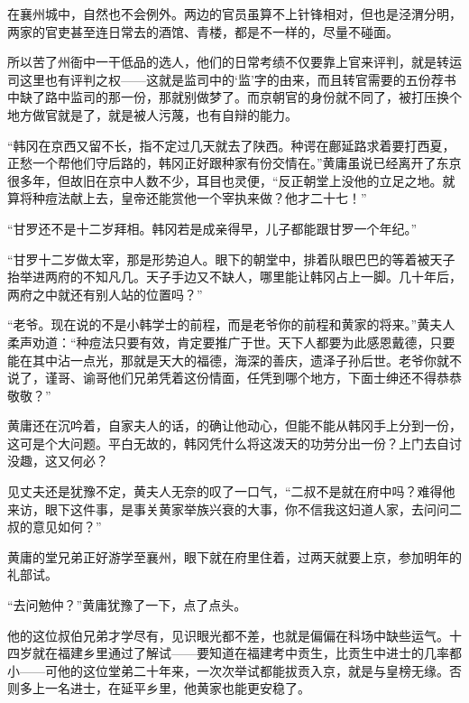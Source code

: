 在襄州城中，自然也不会例外。两边的官员虽算不上针锋相对，但也是泾渭分明，两家的官吏甚至连日常去的酒馆、青楼，都是不一样的，尽量不碰面。

所以苦了州衙中一干低品的选人，他们的日常考绩不仅要靠上官来评判，就是转运司这里也有评判之权——这就是监司中的‘监’字的由来，而且转官需要的五份荐书中缺了路中监司的那一份，那就别做梦了。而京朝官的身份就不同了，被打压换个地方做官就是了，就是被人污蔑，也有自辩的能力。

“韩冈在京西又留不长，指不定过几天就去了陕西。种谔在鄜延路求着要打西夏，正愁一个帮他们守后路的，韩冈正好跟种家有份交情在。”黄庸虽说已经离开了东京很多年，但故旧在京中人数不少，耳目也灵便，“反正朝堂上没他的立足之地。就算将种痘法献上去，皇帝还能赏他一个宰执来做？他才二十七！”

“甘罗还不是十二岁拜相。韩冈若是成亲得早，儿子都能跟甘罗一个年纪。”

“甘罗十二岁做太宰，那是形势迫人。眼下的朝堂中，排着队眼巴巴的等着被天子抬举进两府的不知凡几。天子手边又不缺人，哪里能让韩冈占上一脚。几十年后，两府之中就还有别人站的位置吗？”

“老爷。现在说的不是小韩学士的前程，而是老爷你的前程和黄家的将来。”黄夫人柔声劝道：“种痘法只要有效，肯定要推广于世。天下人都要为此感恩戴德，只要能在其中沾一点光，那就是天大的福德，海深的善庆，遗泽子孙后世。老爷你就不说了，谨哥、谕哥他们兄弟凭着这份情面，任凭到哪个地方，下面士绅还不得恭恭敬敬？”

黄庸还在沉吟着，自家夫人的话，的确让他动心，但能不能从韩冈手上分到一份，这可是个大问题。平白无故的，韩冈凭什么将这泼天的功劳分出一份？上门去自讨没趣，这又何必？

见丈夫还是犹豫不定，黄夫人无奈的叹了一口气，“二叔不是就在府中吗？难得他来访，眼下这件事，是事关黄家举族兴衰的大事，你不信我这妇道人家，去问问二叔的意见如何？”

黄庸的堂兄弟正好游学至襄州，眼下就在府里住着，过两天就要上京，参加明年的礼部试。

“去问勉仲？”黄庸犹豫了一下，点了点头。

他的这位叔伯兄弟才学尽有，见识眼光都不差，也就是偏偏在科场中缺些运气。十四岁就在福建乡里通过了解试——要知道在福建考中贡生，比贡生中进士的几率都小——可他的这位堂弟二十年来，一次次举试都能拔贡入京，就是与皇榜无缘。否则多上一名进士，在延平乡里，他黄家也能更安稳了。

